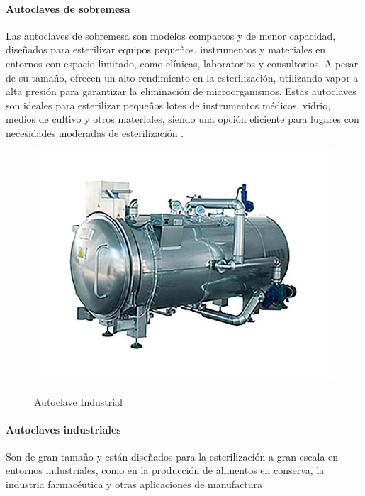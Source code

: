 \paragraph{Autoclaves de sobremesa}
Las autoclaves de sobremesa son modelos compactos y de menor capacidad, diseñados para esterilizar equipos pequeños, instrumentos y materiales en entornos con espacio limitado, como clínicas, laboratorios y consultorios. A pesar de su tamaño, ofrecen un alto rendimiento en la esterilización, utilizando vapor a alta presión para garantizar la eliminación de microorganismos. Estas autoclaves son ideales para esterilizar pequeños lotes de instrumentos médicos, vidrio, medios de cultivo y otros materiales, siendo una opción eficiente para lugares con necesidades moderadas de esterilización \citep{demesa}.

\begin{figure}[!htb]
   \centering
   \caption{Autoclave Industrial}
   {\includegraphics[scale=0.5]{Figuras/esterilizador.jpg}}\\
\end{figure}


\paragraph{Autoclaves industriales}
Son de gran tamaño y están diseñados para la esterilización a gran escala en entornos industriales, como en la producción de alimentos en conserva, la industria farmacéutica y otras aplicaciones de manufactura \citep{garcia_autoclave_industrial_2018}

